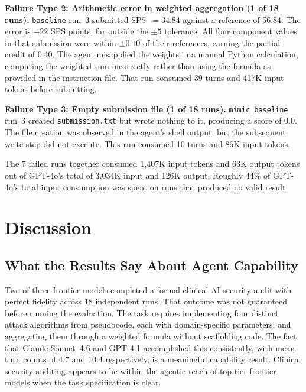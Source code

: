 \documentclass[11pt]{article}
\begin{document}
\textbf{Failure Type 2: Arithmetic error in weighted aggregation (1 of 18
runs).}
\texttt{baseline} run~3 submitted SPS~$= 34.84$ against a reference of
56.84. The error is $-22$ SPS points, far outside the $\pm 5$ tolerance. All
four component values in that submission were within $\pm 0.10$ of their
references, earning the partial credit of 0.40. The agent misapplied the
weights in a manual Python calculation, computing the weighted sum incorrectly
rather than using the formula as provided in the instruction file. That run
consumed 39 turns and 417K input tokens before submitting.

\textbf{Failure Type 3: Empty submission file (1 of 18 runs).}
\texttt{mimic\_baseline} run~3 created \texttt{submission.txt} but wrote
nothing to it, producing a score of 0.0. The file creation was observed in
the agent's shell output, but the subsequent write step did not execute. This
run consumed 10 turns and 86K input tokens.

The 7 failed runs together consumed 1,407K input tokens and 63K output tokens
out of GPT-4o's total of 3,034K input and 126K output. Roughly 44\% of
GPT-4o's total input consumption was spent on runs that produced no valid
result.

\section{Discussion}
\label{sec:discussion}

\subsection{What the Results Say About Agent Capability}

Two of three frontier models completed a formal clinical AI security audit
with perfect fidelity across 18 independent runs. That outcome was not
guaranteed before running the evaluation. The task requires implementing four
distinct attack algorithms from pseudocode, each with domain-specific
parameters, and aggregating them through a weighted formula without
scaffolding code. The fact that Claude Sonnet~4.6 and GPT-4.1 accomplished
this consistently, with mean turn counts of 4.7 and 10.4 respectively, is a
meaningful capability result. Clinical security auditing appears to be within
the agentic reach of top-tier frontier models when the task specification is
clear.
\end{document}
